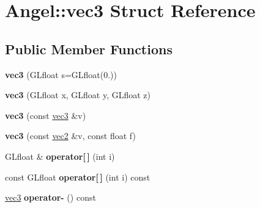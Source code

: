 \hypertarget{struct_angel_1_1vec3}{\section{\-Angel\-:\-:vec3 \-Struct \-Reference}
\label{struct_angel_1_1vec3}
}
\subsection*{\-Public \-Member \-Functions}
\begin{DoxyCompactItemize}
\item 
\hypertarget{struct_angel_1_1vec3_a420358f913d30a659761e3a86026cd59}{{\bfseries vec3} (\-G\-Lfloat s=\-G\-Lfloat(0.))}\label{struct_angel_1_1vec3_a420358f913d30a659761e3a86026cd59}

\item 
\hypertarget{struct_angel_1_1vec3_a9970b9133cd349d038456ae7309fbeba}{{\bfseries vec3} (\-G\-Lfloat x, \-G\-Lfloat y, \-G\-Lfloat z)}\label{struct_angel_1_1vec3_a9970b9133cd349d038456ae7309fbeba}

\item 
\hypertarget{struct_angel_1_1vec3_a3af0b92e9cb01f0cda2f66c007e196c9}{{\bfseries vec3} (const \hyperlink{struct_angel_1_1vec3}{vec3} \&v)}\label{struct_angel_1_1vec3_a3af0b92e9cb01f0cda2f66c007e196c9}

\item 
\hypertarget{struct_angel_1_1vec3_a597ff15b14f6bd9e75382525f6da00bd}{{\bfseries vec3} (const \hyperlink{struct_angel_1_1vec2}{vec2} \&v, const float f)}\label{struct_angel_1_1vec3_a597ff15b14f6bd9e75382525f6da00bd}

\item 
\hypertarget{struct_angel_1_1vec3_a571e36d7c9542eb3464b8fde016d040d}{\-G\-Lfloat \& {\bfseries operator\mbox{[}$\,$\mbox{]}} (int i)}\label{struct_angel_1_1vec3_a571e36d7c9542eb3464b8fde016d040d}

\item 
\hypertarget{struct_angel_1_1vec3_ad78e907775d490a69aa879a34e7dfe5c}{const \-G\-Lfloat {\bfseries operator\mbox{[}$\,$\mbox{]}} (int i) const }\label{struct_angel_1_1vec3_ad78e907775d490a69aa879a34e7dfe5c}

\item 
\hypertarget{struct_angel_1_1vec3_a5ec954ef19e3d1ceed6ce25ebe32c3ee}{\hyperlink{struct_angel_1_1vec3}{vec3} {\bfseries operator-\/} () const }\label{struct_angel_1_1vec3_a5ec954ef19e3d1ceed6ce25ebe32c3ee}


\end{DoxyCompactItemize}
